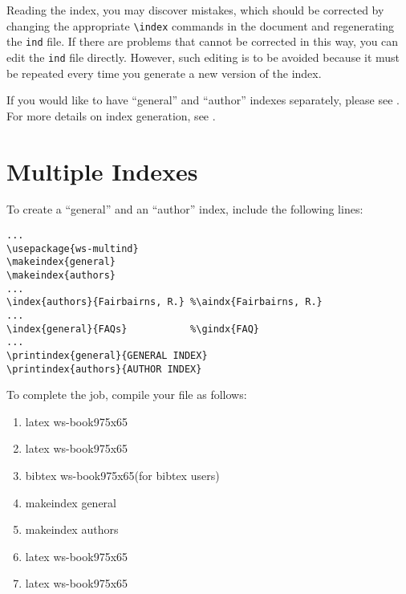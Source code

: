 Reading the index, you may discover mistakes, which
should be corrected by changing the appropriate \verb|\index|
commands in the document and regenerating the {\tt ind} file.  If
there are problems that cannot be corrected in this way, you can
edit the {\tt ind} file directly.  However, such editing is
to be avoided because it must be repeated every time you generate a
new version of the index.

If you would like to have ``general'' and ``author'' indexes
separately, please see . For more details on index
generation, see \cite{lamp87}.

\section{Multiple Indexes}\label{sec3.1}

To create a ``general'' and an ``author'' index, include the following lines:

\begin{verbatim}
...
\usepackage{ws-multind}
\makeindex{general}
\makeindex{authors}
...
\index{authors}{Fairbairns, R.} %\aindx{Fairbairns, R.}
...
\index{general}{FAQs}           %\gindx{FAQ}
...
\printindex{general}{GENERAL INDEX}
\printindex{authors}{AUTHOR INDEX}
\end{verbatim}

To complete the job, compile your file as follows:

\begin{enumerate}[(4)]
\item latex ws-book975x65
\item latex ws-book975x65
\item bibtex ws-book975x65\qquad(for bibtex users)
\item makeindex general
\item makeindex authors
\item latex ws-book975x65
\item latex ws-book975x65
\end{enumerate}
